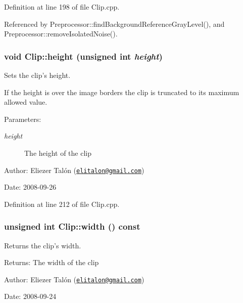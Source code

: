 Definition at line 198 of file Clip.cpp.

Referenced by Preprocessor::findBackgroundReferenceGrayLevel(), and Preprocessor::removeIsolatedNoise().\hypertarget{class_clip_c6eeb473cb104e6e3f90f4099c7ef741}{
\subsubsection[height]{\setlength{\rightskip}{0pt plus 5cm}void Clip::height (unsigned int {\em height})}}
\label{class_clip_c6eeb473cb104e6e3f90f4099c7ef741}


Sets the clip's height. 

If the height is over the image borders the clip is truncated to its maximum allowed value.

\begin{Desc}
\item[Parameters:]
\begin{description}
\item[{\em height}]The height of the clip\end{description}
\end{Desc}
\begin{Desc}
\item[Author:]Eliezer Talón (\href{mailto:elitalon@gmail.com}{\tt elitalon@gmail.com}) \end{Desc}
\begin{Desc}
\item[Date:]2008-09-26 \end{Desc}


Definition at line 212 of file Clip.cpp.\hypertarget{class_clip_d3e816599913e4051e5d50fae17ecd76}{
\subsubsection[width]{\setlength{\rightskip}{0pt plus 5cm}unsigned int Clip::width () const}}
\label{class_clip_d3e816599913e4051e5d50fae17ecd76}


Returns the clip's width. 

\begin{Desc}
\item[Returns:]The width of the clip\end{Desc}
\begin{Desc}
\item[Author:]Eliezer Talón (\href{mailto:elitalon@gmail.com}{\tt elitalon@gmail.com}) \end{Desc}
\begin{Desc}
\item[Date:]2008-09-24 \end{Desc}


